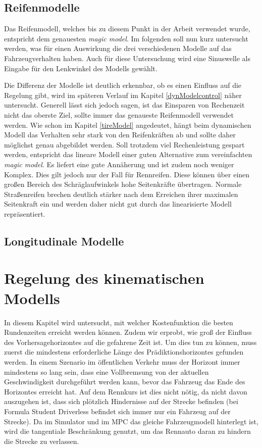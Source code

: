 \documentclass{like}
\begin{document}
\section{Reifenmodelle}
Das Reifenmodell, welches bis zu diesem Punkt in der Arbeit verwendet wurde, entspricht dem genauesten \emph{magic model}. Im folgenden soll nun kurz untersucht werden, was für einen Auswirkung die drei verschiedenen Modelle auf das Fahrzeugverhalten haben. Auch für diese Untersuchung wird eine Sinuswelle als Eingabe für den Lenkwinkel des Modells gewählt.


\begin{figure}
	\centering
	 
	\caption{}
	\label{fig:modelDiffTires}
\end{figure}

Die Differenz der Modelle ist deutlich erkennbar, ob es einen Einfluss auf die Regelung gibt, wird im späteren Verlauf im Kapitel \ref{dynModelcontrol} näher untersucht. Generell lässt sich jedoch sagen, ist das Einsparen von Rechenzeit nicht das oberste Ziel, sollte immer das genaueste Reifenmodell verwendet werden. Wie schon im Kapitel \ref{tireModel} angedeutet, hängt beim dynamischen Modell das Verhalten sehr stark von den Reifenkräften ab und sollte daher möglichst genau abgebildet werden. Soll trotzdem viel Rechenleistung gespart werden, entspricht das lineare Modell einer guten Alternative zum vereinfachten \emph{magic model}. Es liefert eine gute Annäherung und ist zudem noch weniger Komplex. Dies gilt jedoch nur der Fall für Rennreifen. Diese können über einen großen Bereich des Schräglaufwinkels hohe Seitenkräfte übertragen. Normale Straßenreifen brechen deutlich stärker nach dem Erreichen ihrer maximalen Seitenkraft ein und werden daher nicht gut durch das linearisierte Modell repräsentiert. 


\section{Longitudinale Modelle}




\chapter{Regelung des kinematischen Modells}
In diesem Kapitel wird untersucht, mit welcher Kostenfunktion die besten Rundenzeiten erreicht werden können. Zudem wir erprobt, wie groß der Einfluss des Vorhersagehorizontes auf die gefahrene Zeit ist. Um dies tun zu können, muss zuerst die mindestens erforderliche Länge des Prädiktionshorizontes gefunden werden. In einem Szenario im öffentlichen Verkehr muss der Horizont immer mindestens so lang sein, dass eine Vollbremsung von der aktuellen Geschwindigkeit durchgeführt werden kann, bevor das Fahrzeug das Ende des Horizontes erreicht hat. Auf dem Rennkurs ist dies nicht nötig, da nicht davon auszugehen ist, dass sich plötzlich Hindernisse auf der Strecke befinden (bei Formula Student Driverless befindet sich immer nur ein Fahrzeug auf der Strecke). Da im Simulator und im \ac{MPC} das gleiche Fahrzeugmodell hinterlegt ist, wird die tangentiale Beschränkung genutzt, um das Rennauto daran zu hindern die Strecke zu verlassen.
\end{document}

